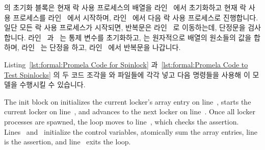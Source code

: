 \iffalse

\begin{fcvref}[ln:formal:promela:lock:spin]
These macros are tested by the Promela code shown in
Listing~\ref{lst:formal:Promela Code to Test Spinlocks}.
This code is similar to that used to test the increments,
with the number of locking processes defined by the \co{N_LOCKERS}
macro definition on line~\lnref{nlockers}.
The mutex itself is defined on line~\lnref{mutex},
an array to track the lock owner
on line~\lnref{array}, and line~\lnref{sum} is used by assertion
code to verify that only one process holds the lock.
\end{fcvref}

\begin{fcvref}[ln:formal:promela:lock:spin:locker]
The locker process is on \clnrefrange{b}{e}, and simply loops forever
acquiring the lock on line~\lnref{lock}, claiming it on line~\lnref{claim},
unclaiming it on line~\lnref{unclaim}, and releasing it on line~\lnref{unlock}.
\end{fcvref}

\fi

\begin{fcvref}
 의 초기화 블록은 현재 락 사용 프로세스의 
배열을 라인~ 에서 초기화하고 현재 락 사용 프로세스를
라인~ 에서 시작하며, 라인~ 에서 다음 락 사용
프로세스로 진행합니다.
일단 모든 락 사용 프로세스가 시작되면,  반복문은
라인~ 로 이동하는데, 단정문을 검사합니다.
라인~ 과~ 는 통제 변수를 초기화하고,
 는 원자적으로  배열의 원소들의 값을
합하며, 라인~ 는 단정을 하고, 라인~ 에서 반복문을
나갑니다.
\end{fcvref}

Listing~\ref{lst:formal:Promela Code for Spinlock}
과~\ref{lst:formal:Promela Code to Test Spinlocks} 의 두 코드 조각을
 와  파일들에 각각 넣고 다음 명령들을 사용해
이 모델을 수행시킬 수 있습니다.

\iffalse

\begin{fcvref}
The init block on  initializes the current locker's
 array entry on line~, starts the current locker on
line~, and advances to the next locker on line~.
Once all locker processes are spawned, the  loop
moves to line~, which checks the assertion.
Lines~ and~ initialize the control variables,
 atomically sum the  array entries,
line~ is the assertion, and line~ exits the loop.
\end{fcvref}

